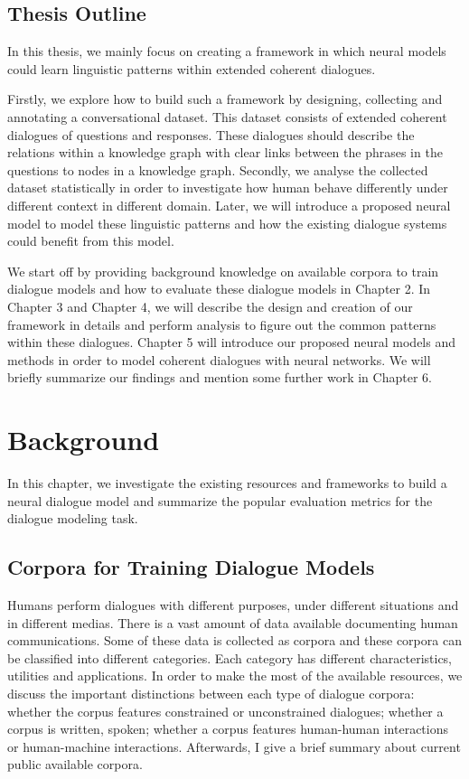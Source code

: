 \documentclass[bsc,frontabs,twoside,singlespacing,parskip,deptreport]{infthesis}     %
\begin{document}
\section {Thesis Outline}

In this thesis, we mainly focus on creating a framework in which neural models could learn linguistic patterns within extended coherent dialogues.

Firstly, we explore how to build such a framework by designing, collecting and annotating a conversational dataset. This dataset consists of extended coherent dialogues of questions and responses. These dialogues should describe the relations within a knowledge graph with clear links between the phrases in the questions to nodes in a knowledge graph. Secondly, we analyse the collected dataset statistically in order to investigate how human behave differently under different context in different domain. Later, we will introduce a proposed neural model to model these linguistic patterns and how the existing dialogue systems could benefit from this model.

We start off by providing background knowledge on available corpora to train dialogue models and how to evaluate these dialogue models in Chapter 2. In Chapter 3 and Chapter 4, we will describe the design and creation of our framework in details and perform analysis to figure out the common patterns within these dialogues. Chapter 5 will introduce our proposed neural models and methods in order to model coherent dialogues with neural networks. We will briefly summarize our findings and mention some further work in Chapter 6.

\chapter{Background}

In this chapter, we investigate the existing resources and frameworks to build a neural dialogue model and summarize the popular evaluation metrics for the dialogue modeling task.

\section{Corpora for Training Dialogue Models}

Humans perform dialogues with different purposes, under different situations and in different medias. There is a vast amount of data available documenting human communications. Some of these data is collected as corpora and these corpora can be classified into different categories. Each category has different characteristics, utilities and applications. In order to make the most of the available resources, we discuss the important distinctions between each type of dialogue corpora: whether the corpus features constrained or unconstrained dialogues; whether a corpus is written, spoken; whether a corpus features human-human interactions or human-machine interactions. Afterwards, I give a brief summary about current public available corpora.
\end{document}
